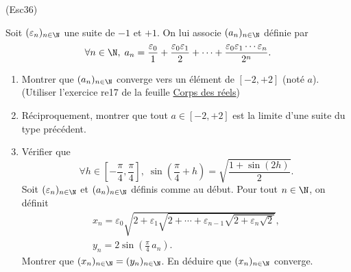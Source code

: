\begin{tiny}(Esc36)\end{tiny} Soit $(\varepsilon_n)_{n\in \N}$ une suite de $-1$ et $+1$. On lui associe $(a_n)_{n\in \N}$ définie par
\[
  \forall n \in \N,\;
  a_n = \frac{\varepsilon_0}{1} + \frac{\varepsilon_0 \varepsilon_1}{2} + \cdots + \frac{\varepsilon_0 \varepsilon_1 \cdots \varepsilon_n}{2^n}.
\]
\begin{enumerate}
  \item Montrer que $(a_n)_{n\in \N}$ converge vers un élément de $\left[-2, +2 \right]$ (noté $a$). \newline
  (Utiliser l'exercice re17 de la feuille \href{\exosurl _fex_re.pdf}{Corps des réels})
  \item Réciproquement, montrer que tout $a \in \left[-2, +2 \right]$ est la limite d'une suite du type précédent.
  \item Vérifier que 
\[
  \forall h \in \left[ -\frac{\pi}{4}, \frac{\pi}{4}\right],\;
  \sin(\frac{\pi}{4} + h) 
  =  \sqrt{\frac{1 + \sin(2h)}{2}}.
\]
Soit $(\varepsilon_n)_{n\in \N}$ et $(a_n)_{n\in \N}$ définis comme au début. Pour tout $n\in \N$, on définit
\begin{multline*}
  x_n = \varepsilon_0\sqrt{2 + \varepsilon_1\sqrt{2 + \cdots + \varepsilon_{n-1}\sqrt{2+\varepsilon_n\sqrt{2}}}}, \\
  y_n = 2 \sin(\frac{\pi}{4}\,a_n).
\end{multline*}
Montrer que $(x_n)_{n\in \N} = (y_n)_{n\in \N}$. En déduire que $(x_n)_{n\in \N}$ converge.
\end{enumerate}
